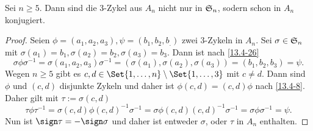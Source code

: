 \begin{lem} \label{20.5-5}
	Sei $n \ge 5$.
	Dann sind die $3$-Zykel aus $A_n$ nicht nur in $\S_n$, sodern schon in $A_n$ konjugiert.
	\begin{proof}
		Seien $\phi = (a_1, a_2, a_3), \psi = (b_1, b_2, b_.)$ zwei $3$-Zykeln in $A_n$.
		Sei $\sigma \in \S_n$ mit $\sigma(a_1) = b_1, \sigma(a_2) = b_2, \sigma(a_3) = b_3$.
		Dann ist nach \ref{13.4-26}
		\[
			\sigma \phi \sigma^{-1} = \sigma (a_1, a_2, a_3) \sigma^{-1} = (\sigma(a_1), \sigma(a_2), \sigma(a_3)) = (b_1, b_2, b_3) = \psi.
		\]
		Wegen $n \ge 5$ gibt es $c, d \in \Set{1, \dotsc, n} \setminus \Set{1, \dotsc, 3}$ mit $c \neq d$.
		Dann sind $\phi$ und $(c,d)$ disjunkte Zykeln und daher ist $\phi (c,d) = (c,d) \phi$ nach \ref{13.4-8}.
		Daher gilt mit $\tau := \sigma (c,d)$
		\[
			\tau \phi \tau^{-1}
			= \sigma (c,d) \phi (c,d)^{-1} \sigma^{-1}
			= \sigma \phi (c,d)(c,d)^{-1} \sigma^{-1}
			= \sigma \phi \sigma^{-1}
			= \psi.
		\]
		Nun ist $\sign \tau = - \sign \sigma$ und daher ist entweder $\sigma$, oder $\tau$ in $A_n$ enthalten.
	\end{proof}
\end{lem}

